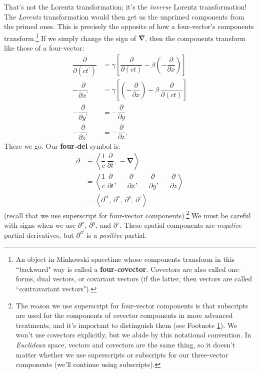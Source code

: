 \documentclass[12pt]{article}
\newcommand{\del}{\boldsymbol{\nabla}}
\begin{document}
That's not the Lorentz transformation; it's the \emph{inverse} Lorentz transformation! The \emph{Lorentz} transformation would then get us the unprimed components from the primed ones. This is precisely the opposite of how a four-vector's components transform.\footnote{\label{fn:cv}An object in Minkowski spacetime whose components transform in this ``backward" way is called a \textbf{four-\emph{co}vector}. Covectors are also called one-forms, dual vectors, or covariant vectors (if the latter, then vectors are called ``contravariant vectors").} If we simply change the sign of $\del$, then the components transform like those of a four-vector:
\begin{equation*}
\begin{split}
\dfrac{\partial}{\partial (ct^\prime)} &= \gamma \left[ \dfrac{\partial}{\partial (ct)} - \beta \left(- \dfrac{\partial}{\partial x} \right) \right] \\[3pt]
- \dfrac{\partial}{\partial x^\prime} &= \gamma \left[ \left( - \dfrac{\partial}{\partial x} \right) - \beta \, \dfrac{\partial}{\partial (ct)}  \right] \\[3pt]
- \dfrac{\partial}{\partial y^\prime} &= - \dfrac{\partial}{\partial y} \\[3pt]
- \dfrac{\partial}{\partial z^\prime} &= - \dfrac{\partial}{\partial z} .
\end{split}
\end{equation*}
There we go. Our \textbf{four-del} symbol is:
\begin{equation}\label{eq:fn}
\boxed{
\begin{aligned}
\partialup &\equiv \left \langle \dfrac{1}{c} \, \dfrac{\partial}{\partial t} , \, - \del \right \rangle \\[3pt]
&= \left \langle \dfrac{1}{c} \, \dfrac{\partial}{\partial t} , \, - \dfrac{\partial}{\partial x}, \, - \dfrac{\partial}{\partial y}, \, - \dfrac{\partial}{\partial z} \right \rangle \\[3pt]
&=  \left \langle \partial^{ct}, \, \partial^x , \, \partial^y , \, \partial^z \right \rangle
\end{aligned}
}
\end{equation}
(recall that we use superscript for four-vector components).\footnote{The reason we use superscript for four-vector components is that subscripts are used for the components of \emph{co}vector components in more advanced treatments, and it's important to distinguish them (see Footnote \ref{fn:cv}). We won't use covectors explicitly, but we abide by this notational convention. In \emph{Euclidean} space, vectors and covectors are the same thing, so it doesn't matter whether we use superscripts or subscripts for our three-vector components (we'll continue using subscripts).} We must be careful with signs when we use $\partial^x$, $\partial^y$, and $\partial^z$. These spatial components are \emph{negative} partial derivatives, but $\partial^{ct}$ is a \emph{positive} partial.
\end{document}
